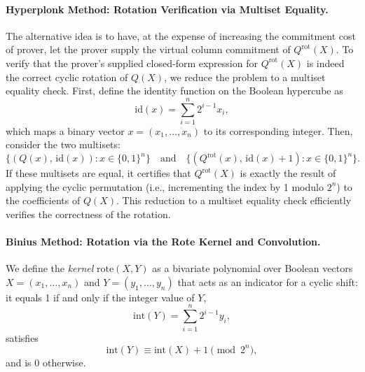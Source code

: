 \documentclass{article}
\begin{document}
\paragraph{Hyperplonk Method: Rotation Verification via Multiset Equality.}  The alternative idea is to have, at the expense of increasing the commitment cost of prover, let the prover supply the virtual column commitment of  \( Q^{\text{rot}}(X) \).
To verify that the prover’s supplied closed-form expression for \( Q^{\text{rot}}(X) \) is indeed the correct cyclic rotation of \( Q(X) \), we reduce the problem to a multiset equality check. First, define the identity function on the Boolean hypercube as
\[
\text{id}(x) = \sum_{i=1}^{n} 2^{i-1} x_i,
\]
which maps a binary vector \( x = (x_1,\dots,x_n) \) to its corresponding integer. Then, consider the two multisets:
\[
\{(Q(x),\, \text{id}(x)) : x \in \{0,1\}^n\} \quad \text{and} \quad \{(Q^{\text{rot}}(x),\, \text{id}(x)+1) : x \in \{0,1\}^n\}.
\]
If these multisets are equal, it certifies that \( Q^{\text{rot}}(X) \) is exactly the result of applying the cyclic permutation (i.e., incrementing the index by 1 modulo \(2^n\)) to the coefficients of \( Q(X) \). This reduction to a multiset equality check efficiently verifies the correctness of the rotation.



\paragraph{Binius Method: Rotation via the Rote Kernel and Convolution.}  
We define the\emph{ kernel} \(\text{rote}(X,Y)\) as a bivariate polynomial over Boolean vectors \(X = (x_1,\dots,x_n)\) and \(Y = (y_1,\dots,y_n)\) that acts as an indicator for a cyclic shift: it equals 1 if and only if the integer value of \(Y\),
\[
\text{int}(Y)=\sum_{i=1}^n 2^{i-1} y_i,
\]
satisfies
\[
\text{int}(Y) \equiv \text{int}(X)+1 \pmod{2^n},
\]
and is 0 otherwise.
\end{document}
